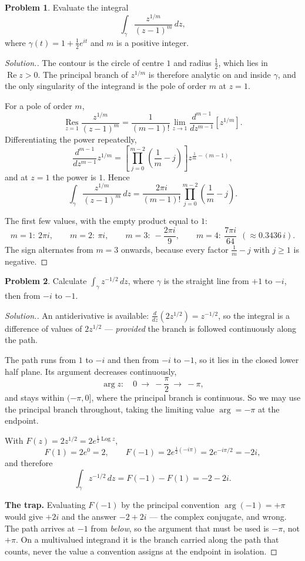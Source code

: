 \documentclass[11pt,a4paper]{article}
\theoremstyle{definition}
\newtheorem{problemx}{Problem}[section]
\newenvironment{problem}{\begin{problemx}}{\end{problemx}}
\newenvironment{solution}
  {\renewcommand{\qedsymbol}{}\begin{proof}[\textit{Solution}.]}
  {\end{proof}}
\begin{document}
\begin{problem}
Evaluate the integral
$$\int_{\gamma}\frac{z^{1/m}}{(z - 1)^{m}}\,dz,$$
where $\gamma(t) = 1 + \tfrac{1}{2}e^{it}$ and $m$ is a positive integer.
\end{problem}

\begin{solution}
The contour is the circle of centre $1$ and radius $\frac12$, which lies in
$\operatorname{Re}z > 0$. The principal branch of $z^{1/m}$ is therefore analytic
on and inside $\gamma$, and the only singularity of the integrand is the pole of
order $m$ at $z = 1$.

For a pole of order $m$,
$$\operatorname*{Res}_{z=1}\frac{z^{1/m}}{(z-1)^{m}}
= \frac{1}{(m-1)!}\lim_{z\to1}\frac{d^{m-1}}{dz^{m-1}}\left[z^{1/m}\right].$$
Differentiating the power repeatedly,
$$\frac{d^{m-1}}{dz^{m-1}}z^{1/m}
= \left[\prod^{m-2}_{j=0}\left(\frac{1}{m}-j\right)\right] z^{\frac1m-(m-1)},$$
and at $z = 1$ the power is $1$. Hence
$$\boxed{\int_{\gamma}\frac{z^{1/m}}{(z-1)^{m}}\,dz
= \frac{2\pi i}{(m-1)!}\prod^{m-2}_{j=0}\left(\frac{1}{m}-j\right).}$$

The first few values, with the empty product equal to $1$:
$$m=1:\ 2\pi i,\qquad
m=2:\ \pi i,\qquad
m=3:\ -\frac{2\pi i}{9},\qquad
m=4:\ \frac{7\pi i}{64}\ \ (\approx 0.3436\,i).$$
The sign alternates from $m = 3$ onwards, because every factor
$\frac1m - j$ with $j \geq 1$ is negative.
\end{solution}


\begin{problem}
Calculate $\displaystyle\int_{\gamma} z^{-1/2}\,dz$, where $\gamma$ is the
straight line from $+1$ to $-i$, then from $-i$ to $-1$.
\end{problem}

\begin{solution}
An antiderivative is available: $\frac{d}{dz}\left(2z^{1/2}\right) = z^{-1/2}$,
so the integral is a difference of values of $2z^{1/2}$ --- \emph{provided} the
branch is followed continuously along the path.

The path runs from $1$ to $-i$ and then from $-i$ to $-1$, so it lies in the closed
lower half plane. Its argument decreases continuously,
$$\arg z:\quad 0 \ \longrightarrow\ -\frac{\pi}{2}
\ \longrightarrow\ -\pi ,$$
and stays within $(-\pi, 0]$, where the principal branch is continuous. So we may
use the principal branch throughout, taking the limiting value $\arg = -\pi$ at
the endpoint.

With $F(z) = 2z^{1/2} = 2e^{\frac12 \operatorname{Log} z}$,
$$F(1) = 2e^{0} = 2,\qquad
F(-1) = 2e^{\frac12(-i\pi)} = 2e^{-i\pi/2} = -2i,$$
and therefore
$$\boxed{\int_{\gamma} z^{-1/2}\,dz = F(-1) - F(1) = -2 - 2i .}$$

\textbf{The trap.} Evaluating $F(-1)$ by the principal convention $\arg(-1) = +\pi$
would give $+2i$ and the answer $-2 + 2i$ --- the complex conjugate, and wrong. The
path arrives at $-1$ from \emph{below}, so the argument that must be used is
$-\pi$, not $+\pi$. On a multivalued integrand it is the branch carried along the
path that counts, never the value a convention assigns at the endpoint in
isolation.
\end{solution}
\end{document}

